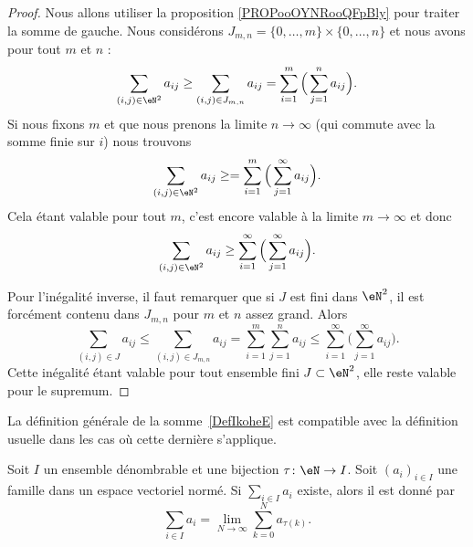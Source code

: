 \begin{proof}
    Nous allons utiliser la proposition \ref{PROPooOYNRooQFpBly} pour traiter la somme de gauche. Nous considérons \( J_{m,n}=\{ 0,\ldots, m \}\times \{ 0,\ldots, n \}\) et nous avons pour tout \( m\) et \( n\) :
	\begin{equation}
		\sum_{(i,j)\in \eN^2}a_{ij}\geq \sum_{(i,j)\in J_{m,n}}a_{ij}=\sum_{i=1}^m\Big( \sum_{j=1}^na_{ij} \Big).
	\end{equation}
	Si nous fixons \( m\) et que nous prenons la limite \( n\to \infty\) (qui commute avec la somme finie sur \( i\)) nous trouvons
	\begin{equation}
		\sum_{(i,j)\in \eN^2}a_{ij}\geq =\sum_{i=1}^m\Big( \sum_{j=1}^{\infty}a_{ij} \Big).
	\end{equation}
	Cela étant valable pour tout \( m\), c'est encore valable à la limite \( m\to \infty\) et donc
	\begin{equation}
		\sum_{(i,j)\in \eN^2}a_{ij}\geq \sum_{i=1}^{\infty}\Big( \sum_{j=1}^{\infty}a_{ij} \Big).
	\end{equation}

	Pour l'inégalité inverse, il faut remarquer que si \( J\) est fini dans \( \eN^2\), il est forcément contenu dans \( J_{m,n}\) pour \( m\) et \( n\) assez grand. Alors
	\begin{equation}
		\sum_{(i,j)\in J}a_{ij}\leq \sum_{(i,j)\in J_{m,n}}a_{ij}=\sum_{i=1}^m\sum_{j=1}^na_{ij}\leq \sum_{i=1}^{\infty}\Big( \sum_{j=1}^{\infty}a_{ij} \Big).
	\end{equation}
	Cette inégalité étant valable pour tout ensemble fini \( J\subset \eN^2\), elle reste valable pour le supremum.
\end{proof}

La définition générale de la somme~\ref{DefIkoheE} est compatible avec la définition usuelle dans les cas où cette dernière s'applique.
\begin{proposition}\label{PropoWHdjw}
	Soit \( I\) un ensemble dénombrable et une bijection \( \tau\colon \eN\to I\). Soit \( (a_i)_{i\in I}\) une famille dans un espace vectoriel normé.  Si \( \sum_{i\in I}a_i\) existe, alors il est donné par
	\begin{equation}
		\sum_{i\in I}a_i=\lim_{N\to \infty} \sum_{k=0}^Na_{\tau(k)}.
	\end{equation}
\end{proposition}

